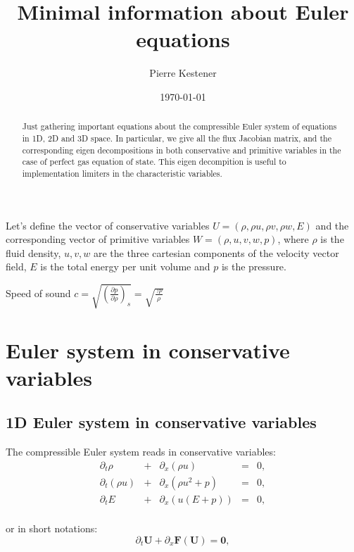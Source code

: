 \documentclass{article}
\title{Minimal information about Euler equations}
\author{Pierre Kestener}
\date{\today}
\begin{document}
\maketitle

\begin{abstract}
Just gathering important equations about the compressible Euler system of equations in 1D, 2D and 3D space. In particular, we give all the flux Jacobian matrix, and the corresponding eigen decompositions in both conservative and primitive variables in the case of perfect gas equation of state. This eigen decompition is useful to implementation limiters in the characteristic variables.
\end{abstract}

Let's define the vector of conservative variables $U=(\rho, \rho u, \rho v, \rho w, E)$ and the corresponding vector of primitive variables $W=(\rho, u, v, w, p)$, where $\rho$ is the fluid density, $u,v,w$ are the three cartesian components of the velocity vector field, $E$ is the total energy per unit volume and $p$ is the pressure.

Speed of sound $c=\sqrt{\left(\frac{\partial p}{\partial \rho}\right)_s} = \sqrt{\frac{\gamma p}{\rho}}$

\section{Euler system in conservative variables}

\subsection*{1D Euler system in conservative variables}
The compressible Euler system reads in conservative variables:\\
\begin{equation}
  \begin{array}{ccccc}
    \partial_t \rho & + & \partial_x(\rho u) & = & 0,\\
    \partial_t (\rho u) & + & \partial_x(\rho u^2+p) & = & 0,\\
    \partial_t E & + & \partial_x (u(E+p)) & = & 0,\\
  \end{array}
\end{equation}

or in short notations:
\begin{equation*}
  \partial_t \mathbf{U} + \partial_x \mathbf{F(U)} = \mathbf{0},
\end{equation*}
\end{document}
